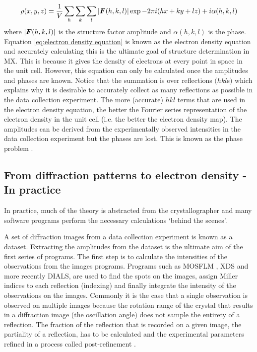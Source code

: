         \begin{equation}
            \rho(x,y,z) = \frac{1}{V} \sum_h \sum_k \sum_l |\boldsymbol{F}(h,k,l)| \exp{-2\pi i (hx + ky + lz) + i \alpha(h,k,l)}
            \label{eq:electron density equation}
        \end{equation}
        where $|\boldsymbol{F}(h,k,l)|$ is the structure factor amplitude and $\alpha(h,k,l)$ is the phase. Equation \ref{eq:electron density equation} is known as the electron density equation and accurately calculating this is the ultimate goal of structure determination in MX.
        This is because it gives the density of electrons at every point in space in the unit cell.
        However, this equation can only be calculated once the amplitudes and phases are known.
        Notice that the summation is over reflections $(hkl$s$)$ which explains why it is desirable to accurately collect as many reflections as possible in the data collection experiment.
        The more (accurate) $hkl$ terms that are used in the electron density equation, the better the Fourier series representation of the electron density in the unit cell (i.e. the better the electron density map).
        The amplitudes can be derived from the experimentally observed intensities in the data collection experiment but the phases are lost. This is known as the phase problem \cite{taylor2010}.

    \subsection{From diffraction patterns to electron density - In practice}
    \label{sub:From diffraction patterns to electron density - In practice}
        In practice, much of the theory is abstracted from the crystallographer and many software programs perform the necessary calculations `behind the scenes'.

        A set of diffraction images from a data collection experiment is known as a dataset. Extracting the amplitudes from the dataset is the ultimate aim of the first series of programs.
        The first step is to calculate the intensities of the observations from the images programs.
        Programs such as MOSFLM \cite{leslie2007}, XDS \cite{kabsch2010} and more recently DIALS, are used to find the spots on the images, assign Miller indices to each reflection (indexing) and finally integrate the intensity of the observations on the images.
        Commonly it is the case that a single observation is observed on multiple images because the rotation range of the crystal that results in a diffraction image (the oscillation angle) does not sample the entirety of a reflection.
        The fraction of the reflection that is recorded on a given image, the partiality of a reflection, has to be calculated and the experimental parameters refined in a process called post-refinement \cite{rossmann1979processing, rossmann1979oscillation}.

